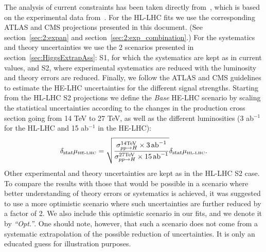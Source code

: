 The analysis of current constraints has been taken directly from~\cite{deBlas:2018tjm}, which is based on the experimental data from~\cite{Aaltonen:2013ipa,Abazov:2013gmz,Chatrchyan:2013iaa,Chatrchyan:2013vaa,Chatrchyan:2013zna,Aad:2014eha,Aad:2014eva,Aad:2014xzb,ATLAS:2014aga,Chatrchyan:2014nva,Khachatryan:2014ira,Khachatryan:2014jba,Khachatryan:2014qaa,Aad:2015gba,Aad:2015gra,Aad:2015ona,Aad:2015vsa,ATLAS:2016gld,CMS:2016mmc,Khachatryan:2016vau,Aaboud:2017jvq,Aaboud:2017ojs,Aaboud:2017rss,Aaboud:2017uhw,Aaboud:2017vzb,Aaboud:2017xsd,CMS:2017rli,CMS-PAS-HIG-17-007,CMS-PAS-HIG-17-019,Sirunyan:2017elk,Sirunyan:2017exp,Sirunyan:2017khh,Aaboud:2018xdt,ATLAS-CONF-2018-004,Sirunyan:2018egh,Sirunyan:2018mvw,Sirunyan:2018shy,Sirunyan:2018ygk}. 
For the HL-LHC fits we use the corresponding ATLAS and CMS projections presented in this document. (See section~\ref{sec:2:expan} and section~\ref{sec:2:exp_combination}.)  For the systematics and theory uncertainties we use the 2 scenarios presented in section~\ref{sec:HiggsExtrapAss}: S1, for which the systematics are kept as in current values, and S2, where experimental systematics are reduced with the luminosity and theory errors are reduced.
%
Finally, we follow the ATLAS and CMS guidelines to estimate the HE-LHC uncertainties for the different signal strengths.  
Starting from the HL-LHC S2 projections we define the {\it Base} HE-LHC scenario by scaling the statistical uncertainties according to the changes in the production cross section going from 14 TeV to 27 TeV, as well as the different luminosities (3 ab$^{-1}$ for the HL-LHC and 15 ab$^{-1}$ in the HE-LHC):
%
\begin{equation}
\delta_{\mathrm{stat}} \mu_{\mbox{\tiny HE-LHC}} = \sqrt{\frac{\sigma_{pp\to H}^{\mathrm{14 TeV}}\times 3~\!\mathrm{ab}^{-1}}{\sigma_{pp\to H}^{\mathrm{27 TeV}}\times 15~\! \mathrm{ab}^{-1}}} \delta_{\mathrm{stat}} \mu_{\mbox{\tiny HL-LHC}} .
\end{equation}
%
Other experimental and theory uncertainties are kept as in the HL-LHC S2 case. 
To compare the results with those that would be possible in a scenario where better understanding of theory errors or systematics is achieved, it was suggested to use a more optimistic scenario where such uncertainties are further reduced by a factor of 2. We also include this optimistic scenario in our fits, and we denote it by {\it ``Opt.''}. One should note, however, that such a scenario does not come from a systematic extrapolation of the possible reduction of uncertainties. It is only an educated guess for illustration purposes.
\vspace{1cm}
 

